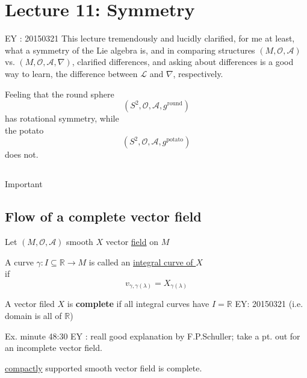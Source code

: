 \section{Lecture 11: Symmetry}

EY : 20150321 This lecture tremendously and lucidly clarified, for me at least, what a symmetry of the Lie algebra is, and in comparing structures $(M,\mathcal{O}, \mathcal{A})$ vs. $(M,\mathcal{O}, \mathcal{A}, \nabla)$, clarified differences, and asking about differences is a good way to learn, the difference between $\mathcal{L}$ and $\nabla$, respectively.  

Feeling that the round sphere
\[
(S^2, \mathcal{O}, \mathcal{A},g^{\text{round}})
\]
has rotational symmetry, while \\
the potato
\[
(S^2, \mathcal{O},\mathcal{A}, g^{\text{potato}})
\]
does not.  

\subsection{}

\subsection{}

Important

\subsection{Flow of a complete vector field}

Let $(M,\mathcal{O},\mathcal{A})$ smooth $X$ vector \underline{field} on $M$

\begin{definition}
  A curve $\gamma :I \subseteq \mathbb{R} \to M$ is called an \underline{integral curve of $X$} \\
if 
\[
v_{\gamma,\gamma(\lambda)} = X_{\gamma(\lambda)}
\]
\end{definition}

\begin{definition} A vector filed $X$ is \textbf{complete} if all integral curves have $I = \mathbb{R}$ EY: 20150321 (i.e. domain is all of $\mathbb{R}$)
\end{definition}

Ex. minute 48:30 EY : reall good explanation by F.P.Schuller; take a pt. out for an incomplete vector field.

\begin{theorem}
  \underline{compactly} supported smooth vector field is complete.  
\end{theorem}

